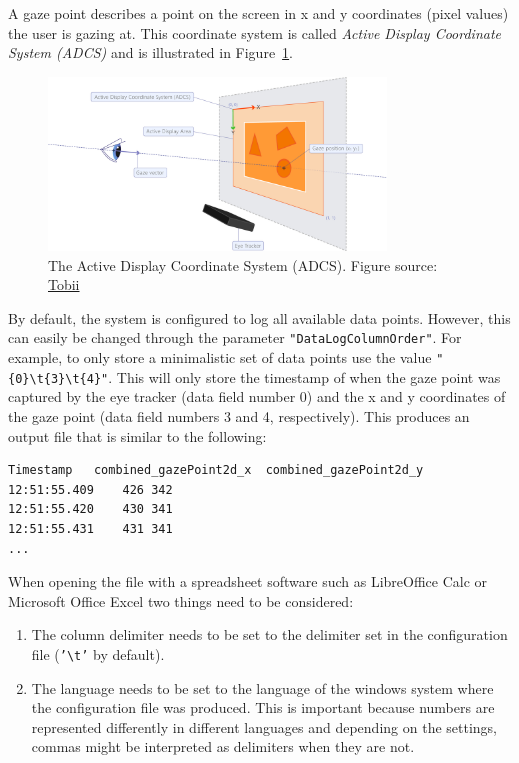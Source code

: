 \documentclass[a4paper,oneside]{book}
\begin{document}
A gaze point describes a point on the screen in x and y coordinates (pixel values) the user is gazing at.
This coordinate system is called \emph{Active Display Coordinate System (ADCS)} and is illustrated in Figure~\ref{fig.adcs}.
\begin{figure}[ht]
    \centering
    \includegraphics[width=0.8\textwidth]{adcs.png}
    \caption{The Active Display Coordinate System (ADCS). Figure source: \href{http://developer.tobiipro.com/commonconcepts/coordinatesystems.html}{Tobii}}
    \label{fig.adcs}
\end{figure}

By default, the system is configured to log all available data points.
However, this can easily be changed through the parameter \texttt{"DataLogColumnOrder"}.
For example, to only store a minimalistic set of data points use the value \texttt{"\{0\}\textbackslash t\{3\}\textbackslash t\{4\}"}.
This will only store the timestamp of when the gaze point was captured by the eye tracker (data field number 0) and the x and y coordinates of the gaze point (data field numbers 3 and 4, respectively).
This produces an output file that is similar to the following:
\lstset{columns=flexible}
\lstset{keepspaces=true}
\begin{lstlisting}
Timestamp   combined_gazePoint2d_x  combined_gazePoint2d_y
12:51:55.409    426 342
12:51:55.420    430 341
12:51:55.431    431 341
...
\end{lstlisting}

When opening the file with a spreadsheet software such as LibreOffice Calc or Microsoft Office Excel two things need to be considered:
\begin{enumerate}
    \item The column delimiter needs to be set to the delimiter set in the configuration file (\texttt{'\textbackslash t'} by default).
    \item The language needs to be set to the language of the windows system where the configuration file was produced.
        This is important because numbers are represented differently in different languages and depending on the settings, commas might be interpreted as delimiters when they are not.
\end{enumerate}
\end{document}
